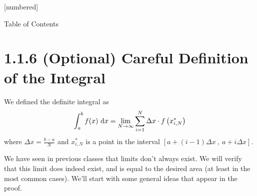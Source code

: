 
[numbered]%
\newtheorem{prop}{Proposition}


 \begin{frame}{Table of Contents }
\mapofcontentsA{\aa,\aintro}
 \end{frame}


\section{1.1.6 (Optional) Careful Definition of the Integral}
\label{note1.1.7}

 \begin{frame}
 We defined the definite integral as
 \[\int_a^b f(x)~\text{d} x  = \lim_{N \to \infty}\sum_{i=1}^N \Delta x \cdot f\left(x_{i,N}^*\right)\]
 where $\Delta x = \frac{b-a}{N}$ and $x_{i,N}^*$ is a point in the interval $\left[a+(i-1)\Delta x~,~a+i\Delta x\right]$.\vfill
 
We have seen in previous classes that limits don't always exist. We will verify that this limit does indeed exist, and is equal to the desired area (at least in the most common cases).
\vfill\pause
We'll start with some general ideas that appear in the proof.
\end{frame}
